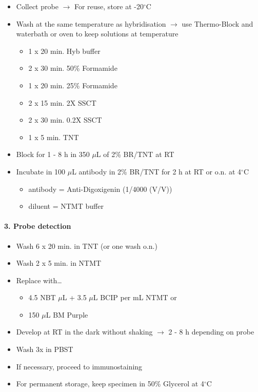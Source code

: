 \documentclass[11pt,singlespacinge,twoside]{reedthesis} %
\providecommand{\tightlist}{%
  \setlength{\itemsep}{0pt}\setlength{\parskip}{0pt}}
\begin{document}
\begin{itemize}
\tightlist
\item
  Collect probe \newline \(\rightarrow\) For reuse, store at -20\(^\circ\)C
\item
  Wash at the same temperature as hybridisation \newline \(\rightarrow\) use Thermo-Block and waterbath or oven to keep solutions at temperature
  \begin{itemize}
  \tightlist
  \item
    1 x 20 min. Hyb buffer
  \item
    2 x 30 min. 50\% Formamide
  \item
    1 x 20 min. 25\% Formamide
  \item
    2 x 15 min. 2X SSCT
  \item
    2 x 30 min. 0.2X SSCT
  \item
    1 x 5 min. TNT
  \end{itemize}
\item
  Block for 1 - 8 h in 350 \(\mu\)L of 2\% BR/TNT at RT
\item
  Incubate in 100 \(\mu\)L antibody in 2\% BR/TNT for 2 h at RT or o.n. at 4\(^\circ\)C
  \begin{itemize}
  \tightlist
  \item
    antibody = Anti-Digoxigenin (1/4000 (V/V))
  \item
    diluent = NTMT buffer
  \end{itemize}
\end{itemize}
\hypertarget{probe-detection}{%
\paragraph{3. Probe detection}\label{probe-detection}}
\begin{itemize}
\tightlist
\item
  Wash 6 x 20 min. in TNT (or one wash o.n.)
\item
  Wash 2 x 5 min. in NTMT
\item
  Replace with\ldots{}
  \begin{itemize}
  \tightlist
  \item
    4.5 NBT \(\mu\)L + 3.5 \(\mu\)L BCIP per mL NTMT or
  \item
    150 \(\mu\)L BM Purple
  \end{itemize}
\item
  Develop at RT in the dark without shaking \newline \(\rightarrow\) 2 - 8 h depending on probe
\item
  Wash 3x in PBST
\item
  If necessary, proceed to immunostaining
\item
  For permanent storage, keep specimen in 50\% Glycerol at 4\(^\circ\)C
\end{itemize}
\end{document}
